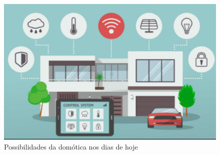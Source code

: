 \begin{figure}[H]
\caption{\label{domotica} Possibilidades da domótica nos dias de hoje}
\includegraphics[scale=0.25]{img/casa-conectada.png}
\end{figure}